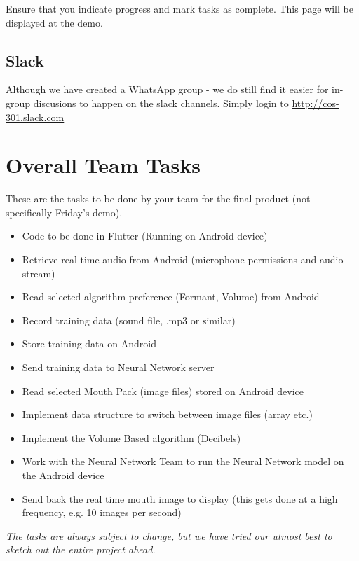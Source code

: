 \documentclass{article}
\begin{document}
Ensure that you indicate progress and mark tasks as complete. This page will be displayed at the demo.

\subsection{Slack}
Although we have created a WhatsApp group - we do still find it easier for in-group discusions to happen on the slack channels. Simply login to \url{http://cos-301.slack.com}

\newpage

\section{Overall Team Tasks}
These are the tasks to be done by your team for the final product (not specifically Friday's demo).

\begin{itemize}
    \item Code to be done in Flutter (Running on Android device)
    \item Retrieve real time audio from Android (microphone permissions and audio stream)
    \item Read selected algorithm preference (Formant, Volume) from Android
    \item Record training data (sound file, .mp3 or similar)
    \item Store training data on Android
    \item Send training data to Neural Network server
    \item Read selected Mouth Pack (image files) stored on Android device
    \item Implement data structure to switch between image files (array etc.)
    \item Implement the Volume Based algorithm (Decibels)
    \item Work with the Neural Network Team to run the Neural Network model on the Android device
    \item Send back the real time mouth image to display (this gets done at a high frequency, e.g. 10 images per second)
\end{itemize}

\vspace{1cm}

\begin{center}
   \textit{The tasks are always subject to change, but we have tried our utmost best to sketch out the entire project ahead.}
\end{center}
\end{document}
